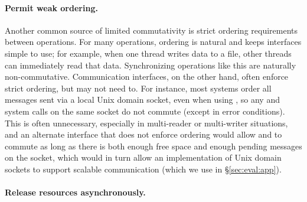 \paragraph{Permit weak ordering.}

Another common source of limited commutativity is strict ordering
requirements between operations.  For many operations, ordering is
natural and keeps interfaces simple to use; for example, when one thread
writes data to a file, other threads can immediately read that data.
%
Synchronizing operations like this are naturally non-commutative.
%
Communication interfaces, on the other hand, often enforce strict
ordering, but may not need to.
For instance, most systems order all messages sent via a local Unix
domain socket, even when using
, so any  and  system
calls on the same socket do not commute (except in error conditions).
This is often unnecessary, especially in multi-reader or multi-writer
situations, and an alternate interface that does not enforce ordering
would allow  and  to commute as long as there is
both enough free space and enough pending messages on the socket, which
would in turn allow an implementation of Unix domain sockets to support
scalable communication (which we use in \S\ref{sec:eval:app}).


\paragraph{Release resources asynchronously.}



